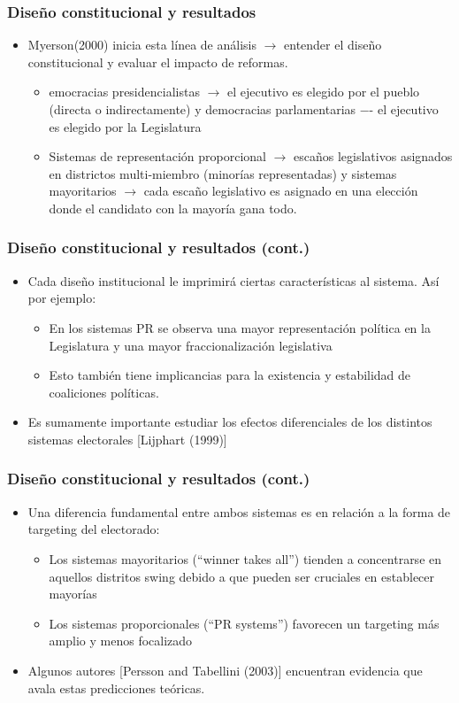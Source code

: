 \documentclass[handout,final,xcolor=dvipsnames]{beamer}
\begin{document}
\begin{frame}\frametitle{Diseño constitucional y resultados}
\begin{itemize}\itemsep 15pt
\item Myerson(2000) inicia esta línea de análisis $\longrightarrow$ entender el diseño constitucional y
evaluar el impacto de reformas.
\begin{itemize}\itemsep 15pt \medskip
\item emocracias presidencialistas $\longrightarrow$ el ejecutivo es elegido por el pueblo (directa
o indirectamente) y democracias parlamentarias −- el ejecutivo es elegido por
la Legislatura
\item Sistemas de representación proporcional $\longrightarrow$ escaños legislativos
  asignados en districtos multi-miembro (minorías representadas) y sistemas mayoritarios $\longrightarrow$
cada escaño legislativo es asignado en una elección donde el candidato con la mayoría
gana todo.
\end{itemize}
\end{itemize}
\end{frame}


\begin{frame}\frametitle{Diseño constitucional y resultados (cont.)}
\begin{itemize}\itemsep 15pt
\item Cada diseño institucional le imprimirá ciertas características al sistema. Así por ejemplo:
\begin{itemize} \itemsep 15pt \medskip
\item En los sistemas PR se observa una mayor representación política en la Legislatura y
una mayor fraccionalización legislativa
\item Esto también tiene implicancias para la existencia y estabilidad
  de coaliciones políticas.
\end{itemize}
\item Es sumamente importante estudiar los efectos diferenciales de los distintos sistemas
electorales [Lijphart (1999)]
\end{itemize}
\end{frame}


\begin{frame}\frametitle{Diseño constitucional y resultados (cont.)}
\begin{itemize}\itemsep 15pt
\item Una diferencia fundamental entre ambos sistemas es en relación a la forma de targeting
del electorado:
\begin{itemize}\itemsep 15pt \medskip
\item Los sistemas mayoritarios (``winner takes all'') tienden a concentrarse en aquellos
distritos swing debido a que pueden ser cruciales en establecer mayorías
\item Los sistemas proporcionales (``PR systems'') favorecen un targeting más amplio y
menos focalizado
\end{itemize}
\item Algunos autores [Persson and Tabellini (2003)] encuentran evidencia que avala estas
predicciones teóricas.
\end{itemize}
\end{frame}
\end{document}
